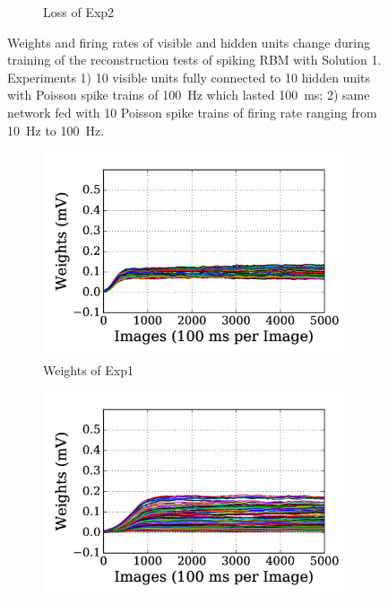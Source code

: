 \begin{figure}
\begin{subfigure}[t]{0.48\textwidth}
		\caption{Loss of Exp2}
	\end{subfigure}
	\caption[SRBM-S1 training of the reconstruction tests.]{Weights and firing rates of visible and hidden units change during training of the reconstruction tests of spiking RBM with Solution 1. 
		Experiments 1) 10 visible units fully connected to 10 hidden units with Poisson spike trains of 100~Hz which lasted 100~ms; 2) same network fed with 10 Poisson spike trains of firing rate ranging from 10~Hz to 100~Hz.}
	\label{fig:sol1_rbm}
\end{figure}

\begin{figure}
	\centering
	\begin{subfigure}[t]{0.48\textwidth}
		\includegraphics[width=\textwidth]{pics_sdlm/03_exp_SAE_noise_long/exp1_weights_s.png}
		\caption{Weights of Exp1}
	\end{subfigure}
	\begin{subfigure}[t]{0.48\textwidth}
		\includegraphics[width=\textwidth]{pics_sdlm/03_exp_SAE_noise_long/exp2_weights_s.png}

\end{subfigure}
\end{figure}
